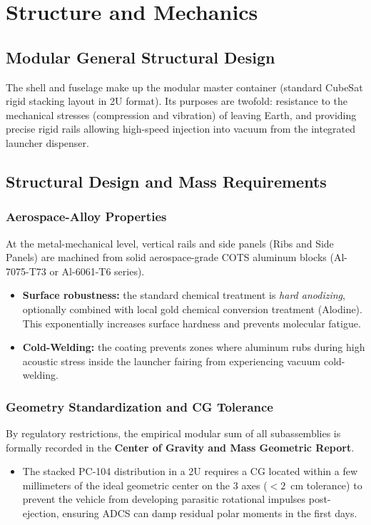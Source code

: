 \chapter{Structure and Mechanics}

\section{Modular General Structural Design}
The shell and fuselage make up the modular master container (standard CubeSat rigid stacking layout in 2U format). Its purposes are twofold: resistance to the mechanical stresses (compression and vibration) of leaving Earth, and providing precise rigid rails allowing high-speed injection into vacuum from the integrated launcher dispenser.

\section{Structural Design and Mass Requirements}
\subsection{Aerospace-Alloy Properties}
At the metal-mechanical level, vertical rails and side panels (Ribs and Side Panels) are machined from solid aerospace-grade COTS aluminum blocks (Al-7075-T73 or Al-6061-T6 series).
\begin{itemize}
    \item \textbf{Surface robustness:} the standard chemical treatment is \textit{hard anodizing}, optionally combined with local gold chemical conversion treatment (Alodine). This exponentially increases surface hardness and prevents molecular fatigue.
    \item \textbf{Cold-Welding:} the coating prevents zones where aluminum rubs during high acoustic stress inside the launcher fairing from experiencing vacuum cold-welding.
\end{itemize}

\subsection{Geometry Standardization and CG Tolerance}
By regulatory restrictions, the empirical modular sum of all subassemblies is formally recorded in the \textbf{Center of Gravity and Mass Geometric Report}.
\begin{itemize}
    \item The stacked PC-104 distribution in a 2U requires a CG located within a few millimeters of the ideal geometric center on the 3 axes ($<2$~cm tolerance) to prevent the vehicle from developing parasitic rotational impulses post-ejection, ensuring ADCS can damp residual polar moments in the first days.
\end{itemize}


